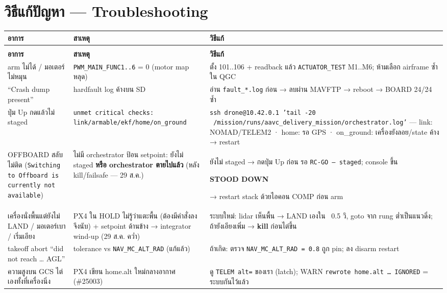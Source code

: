 \documentclass[11pt,a4paper]{article}
\newcommand{\code}[1]{\texttt{\small #1}}
\newcommand{\hlr}[1]{\colorbox{hlred}{\strut\color{stopred}\bfseries #1}}
\begin{document}
\section{วิธีแก้ปัญหา — Troubleshooting}\label{sec:trouble}
\begin{longtable}{@{}>{\raggedright\arraybackslash}p{4.3cm} >{\raggedright\arraybackslash}p{4.6cm} >{\raggedright\arraybackslash}p{7.5cm}@{}}
\toprule
\textbf{อาการ} & \textbf{สาเหตุ} & \textbf{วิธีแก้} \\
\midrule
\endfirsthead
\multicolumn{3}{@{}l}{\small\color{gray}(ต่อ) วิธีแก้ปัญหา}\\
\toprule
\textbf{อาการ} & \textbf{สาเหตุ} & \textbf{วิธีแก้} \\
\midrule
\endhead
\bottomrule
\endfoot
arm ไม่ได้ / มอเตอร์ไม่หมุน & \code{PWM_MAIN_FUNC1..6} = 0 (motor map หลุด) & ตั้ง 101..106 + readback แล้ว \code{ACTUATOR_TEST} M1..M6; ห้ามเลือก airframe ซ้ำใน QGC\\
``Crash dump present'' & hardfault log ค้างบน SD & อ่าน \code{fault_*.log} ก่อน → ลบผ่าน MAVFTP → reboot → BOARD 24/24 ซ้ำ\\
ปุ่ม Up กดแล้วไม่ staged & \code{unmet critical checks: link/armable/ekf/home/on\_ground} & \code{ssh drone@10.42.0.1 'tail -20 ~/mission/runs/aavc_delivery_mission/orchestrator.log'} — link: NOMAD/TELEM2 · home: รอ GPS · on\_ground: เครื่องยังลอย/state ค้าง → restart\\
OFFBOARD สลับไม่ติด (\code{Switching to Offboard is currently not available}) & ไม่มี orchestrator ป้อน setpoint: ยังไม่ staged \textbf{หรือ orchestrator ตายไปแล้ว} (หลัง kill/failsafe — 29 ส.ค.) & ยังไม่ staged → กดปุ่ม Up ก่อน รอ \code{RC-GO — staged}; console ขึ้น \hlr{STOOD DOWN} → restart stack ด้วยไอคอน COMP ก่อน arm\\
เครื่องนั่งพื้นแต่ยังไม่ LAND / มอเตอร์เบา / เริ่มเอียง & PX4 ใน HOLD ไม่รู้ว่าแตะพื้น (ต้องมีคำสั่งลงจึงนับ) + setpoint ด้านข้าง → integrator wind-up (29 ส.ค. คว่ำ) & ระบบใหม่: lidar เห็นพื้น → LAND เองใน ~0.5 วิ, goto จาก rung ต่ำเป็นแนวดิ่ง; ถ้ายังเอียงเพิ่ม → \textbf{kill} ก่อนไต่ขึ้น\\
takeoff abort ``did not reach … AGL'' & tolerance vs \code{NAV_MC_ALT_RAD} (แก้แล้ว) & ถ้าเกิด: ตรวจ \code{NAV_MC_ALT_RAD = 0.8} ถูก pin; ลง disarm restart\\
ความสูงบน GCS ไต่เองทั้งที่เครื่องนิ่ง & PX4 เขียน home.alt ใหม่กลางอากาศ (\#25003) & ดู \code{TELEM alt=} ของเรา (latch); WARN \code{rewrote home.alt … IGNORED} = ระบบกันไว้แล้ว\\

\end{longtable}
\end{document}
